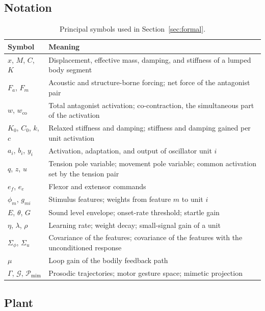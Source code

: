 \documentclass[11pt]{article}
\theoremstyle{plain}
\theoremstyle{definition}
\begin{document}
\subsection{Notation}

\begin{table}[t]
\centering
\small
\renewcommand{\arraystretch}{1.2}
\begin{tabular}{@{}>{\raggedright\arraybackslash}p{3.4cm}>{\raggedright\arraybackslash}p{11cm}@{}}
\toprule
Symbol & Meaning \\
\midrule
$x$, $M$, $C$, $K$ & Displacement, effective mass, damping, and stiffness of a lumped body segment \\
$F_a$, $F_m$ & Acoustic and structure-borne forcing; net force of the antagonist pair \\
$w$, $w_{\mathrm{co}}$ & Total antagonist activation; co-contraction, the simultaneous part of the activation \\
$K_0$, $C_0$, $k$, $c$ & Relaxed stiffness and damping; stiffness and damping gained per unit activation \\
$a_i$, $b_i$, $y_i$ & Activation, adaptation, and output of oscillator unit $i$ \\
$q$, $z$, $u$ & Tension pole variable; movement pole variable; common activation set by the tension pair \\
$e_f$, $e_e$ & Flexor and extensor commands \\
$\phi_m$, $g_{mi}$ & Stimulus features; weights from feature $m$ to unit $i$ \\
$E$, $\theta$, $G$ & Sound level envelope; onset-rate threshold; startle gain \\
$\eta$, $\lambda$, $\rho$ & Learning rate; weight decay; small-signal gain of a unit \\
$\Sigma_\phi$, $\Sigma_u$ & Covariance of the features; covariance of the features with the unconditioned response \\
$\mu$ & Loop gain of the bodily feedback path \\
$\Gamma$, $\mathcal{G}$, $\mathcal{P}_{\mathrm{mim}}$ & Prosodic trajectories; motor gesture space; mimetic projection \\
\bottomrule
\end{tabular}
\caption{Principal symbols used in Section~\ref{sec:formal}.}
\label{tab:notation}
\end{table}

\subsection{Plant}
\end{document}
